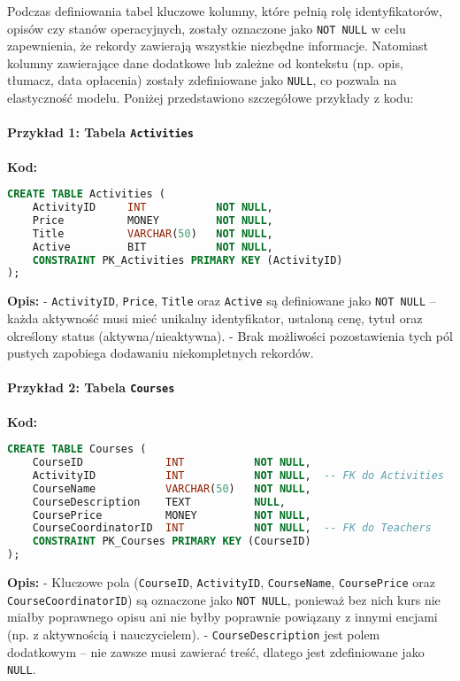 \documentclass[12pt]{article}
\begin{document}
Podczas definiowania tabel kluczowe kolumny, które pełnią rolę identyfikatorów, opisów czy stanów operacyjnych, zostały oznaczone jako \texttt{NOT NULL} w celu zapewnienia, że rekordy zawierają wszystkie niezbędne informacje. Natomiast kolumny zawierające dane dodatkowe lub zależne od kontekstu (np. opis, tłumacz, data opłacenia) zostały zdefiniowane jako \texttt{NULL}, co pozwala na elastyczność modelu. Poniżej przedstawiono szczegółowe przykłady z kodu:

\paragraph{Przykład 1: Tabela \texttt{Activities}}  
\textbf{Kod:}
\begin{lstlisting}[language=SQL]
CREATE TABLE Activities (
    ActivityID     INT           NOT NULL,
    Price          MONEY         NOT NULL,
    Title          VARCHAR(50)   NOT NULL,
    Active         BIT           NOT NULL,
    CONSTRAINT PK_Activities PRIMARY KEY (ActivityID)
);
\end{lstlisting}
\textbf{Opis:}  
- \texttt{ActivityID}, \texttt{Price}, \texttt{Title} oraz \texttt{Active} są definiowane jako \texttt{NOT NULL} – każda aktywność musi mieć unikalny identyfikator, ustaloną cenę, tytuł oraz określony status (aktywna/nieaktywna).  
- Brak możliwości pozostawienia tych pól pustych zapobiega dodawaniu niekompletnych rekordów.

\newpage
\paragraph{Przykład 2: Tabela \texttt{Courses}}  
\textbf{Kod:}
\begin{lstlisting}[language=SQL]
CREATE TABLE Courses (
    CourseID             INT           NOT NULL,
    ActivityID           INT           NOT NULL,  -- FK do Activities
    CourseName           VARCHAR(50)   NOT NULL,
    CourseDescription    TEXT          NULL,
    CoursePrice          MONEY         NOT NULL,
    CourseCoordinatorID  INT           NOT NULL,  -- FK do Teachers
    CONSTRAINT PK_Courses PRIMARY KEY (CourseID)
);
\end{lstlisting}
\textbf{Opis:}  
- Kluczowe pola (\texttt{CourseID}, \texttt{ActivityID}, \texttt{CourseName}, \texttt{CoursePrice} oraz \texttt{CourseCoordinatorID}) są oznaczone jako \texttt{NOT NULL}, ponieważ bez nich kurs nie miałby poprawnego opisu ani nie byłby poprawnie powiązany z innymi encjami (np. z aktywnością i nauczycielem).  
- \texttt{CourseDescription} jest polem dodatkowym – nie zawsze musi zawierać treść, dlatego jest zdefiniowane jako \texttt{NULL}.
\end{document}
